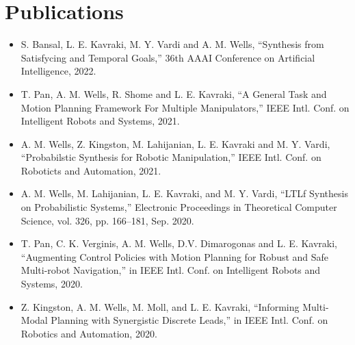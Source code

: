 \section{Publications}

\vspace{6pt}

\begin{itemize}

\item[]{S. Bansal, L. E. Kavraki, M. Y. Vardi and A. M. Wells, ``Synthesis from Satisfycing and Temporal Goals,'' 36th AAAI Conference on Artificial Intelligence, 2022. }

\vspace{1em} 

\item[]{T. Pan, A. M. Wells, R. Shome and L. E. Kavraki, ``A General Task and Motion Planning Framework For Multiple Manipulators,'' IEEE Intl. Conf. on Intelligent Robots and Systems, 2021.}

\vspace{1em} 

\item[] {A. M. Wells, Z. Kingston, M. Lahijanian, L. E. Kavraki and M. Y. Vardi, ``Probabilstic Synthesis for Robotic Manipulation,'' IEEE Intl. Conf. on Roboticts and Automation, 2021.}

\vspace{1em} 

\item[]{A. M. Wells, M. Lahijanian, L. E. Kavraki, and M. Y. Vardi, “LTLf Synthesis on Probabilistic Systems,” Electronic Proceedings in Theoretical Computer Science, vol. 326, pp. 166–181, Sep. 2020.}

\vspace{1em} 

\item[]{T. Pan, C. K. Verginis, A. M. Wells, D.V. Dimarogonas and L. E. Kavraki, “Augmenting Control Policies with Motion Planning for Robust and Safe Multi-robot Navigation,” in IEEE Intl. Conf. on Intelligent Robots and Systems, 2020.}

\vspace{1em} 

\item[]{Z. Kingston, A. M. Wells, M. Moll, and L. E. Kavraki, “Informing Multi-Modal Planning with Synergistic Discrete Leads,” in IEEE Intl. Conf. on Robotics and Automation, 2020.}

\vspace{1em} 


\end{itemize}
